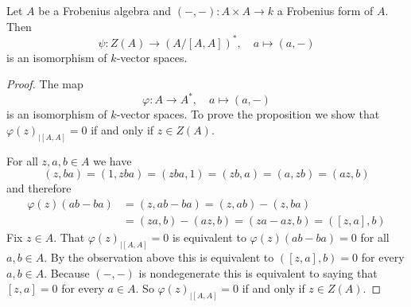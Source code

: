\begin{proposition}
  Let $A$ be a Frobenius algebra and $(-,-) \colon A \times A \to k$ a Frobenius form of $A$. Then
  \[
            \psi
    \colon  Z(A)
    \to     (A/[A,A])^*,
    \quad   a
    \mapsto (a,-)
  \]
  is an isomorphism of $k$-vector spaces.
\end{proposition}
\begin{proof}
  The map
  \[
            \varphi
    \colon  A
    \to     A^*,
    \quad   a
    \mapsto (a, -)
  \]
  is an isomorphism of $k$-vector spaces.
  To prove the proposition we show that $\varphi(z)_{|[A,A]} = 0$ if and only if $z \in Z(A)$.
  
  For all $z, a, b \in A$ we have
  \[
      (z,ba)
    = (1,zba)
    = (zba,1)
    = (zb,a)
    = (a,zb)
    = (az,b)
  \]
  and therefore
  \begin{align*}
        \varphi(z)(ab-ba)
    &=  (z,ab-ba)
     =  (z,ab) - (z,ba) \\
    &=  (za,b) - (az,b)
     =  (za-az,b)
     =  ([z,a],b)
  \end{align*}
  Fix $z \in A$.
  That $\varphi(z)_{|[A,A]} = 0$ is equivalent to $\varphi(z)(ab-ba) = 0$ for all $a,b \in A$.
  By the observation above this is equivalent to $([z,a],b) = 0$ for every $a,b \in A$.
  Because $(-,-)$ is nondegenerate this is equivalent to saying that $[z,a] = 0$ for every $a \in A$.
  So $\varphi(z)_{|[A,A]} = 0$ if and only if $z \in Z(A)$.
\end{proof}




